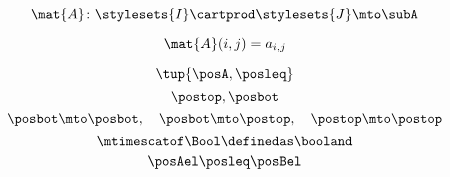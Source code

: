 {\begin{forslides}
    \begin{equation}
        \label{eq:slides_enrichment_74}
        \mat{A} \colon \stylesets{I} \cartprod \stylesets{J} \mto \subA
    \end{equation}

    \begin{equation}
        \label{eq:slides_enrichment_75}
        \mat{A}(i, j) = a_{i,j}
    \end{equation}

    \begin{equation}
        \label{eq:poset_bool_a}
        \tup{\posA,{\posleq}}
    \end{equation}
    \begin{equation}
        \label{eq:poset_bool_b}
        \postop,\posbot
    \end{equation}
    \begin{equation}
        \label{eq:poset_bool_c}
        \posbot\mto \posbot, \quad \posbot\mto \postop, \quad \postop\mto \postop
    \end{equation}
    \begin{equation}
        \label{eq:poset_bool_d}
        \mtimescatof\Bool \definedas \booland
    \end{equation}
    \begin{equation}
        \label{eq:poset_bool_e}
        \posAel\posleq \posBel
    \end{equation}
    \begin{equation}

\end{equation}
\end{forslides}}
